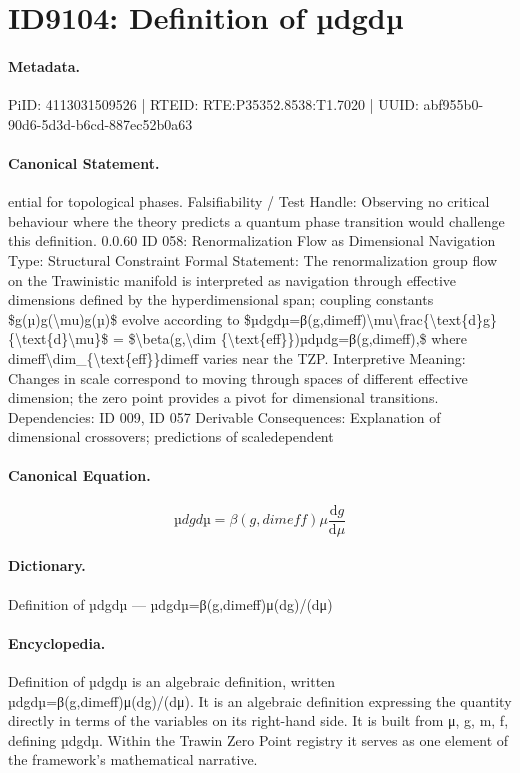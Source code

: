 \section*{ID9104: Definition of µdgdµ}
\paragraph{Metadata.}
PiID: 4113031509526 | RTEID: RTE:P35352.8538:T1.7020 | UUID: abf955b0-90d6-5d3d-b6cd-887ec52b0a63

\paragraph{Canonical Statement.}
ential for topological phases. Falsifiability / Test Handle: Observing no critical behaviour where the theory predicts a quantum phase transition would challenge this definition. 0.0.60 ID 058: Renormalization Flow as Dimensional Navigation Type: Structural Constraint Formal Statement: The renormalization group flow on the Trawinistic manifold is interpreted as navigation through effective dimensions defined by the hyperdimensional span; coupling constants \$g(µ)g(\textbackslash{}mu)g(µ)\$ evolve according to \$µdgdµ=β(g,dimeff)\textbackslash{}mu\textbackslash{}frac\{\textbackslash{}text\{d\}g\}\{\textbackslash{}text\{d\}\textbackslash{}mu\}\$ = \$\textbackslash{}beta(g,\textbackslash{}dim \{\textbackslash{}text\{eff\}\})µdµdg=β(g,dimeff),\$ where dimeff\textbackslash{}dim\_\{\textbackslash{}text\{eff\}\}dimeff varies near the TZP. Interpretive Meaning: Changes in scale correspond to moving through spaces of different effective dimension; the zero point provides a pivot for dimensional transitions. Dependencies: ID 009, ID 057 Derivable Consequences: Explanation of dimensional crossovers; predictions of scaledependent

\paragraph{Canonical Equation.}
\[
µdgdµ=β(g,dimeff)\mu\frac{\text{d}g}{\text{d}\mu}
\]

\paragraph{Dictionary.}
Definition of µdgdµ — µdgdµ=β(g,dimeff)μ(dg)/(dμ)

\paragraph{Encyclopedia.}
Definition of µdgdµ is an algebraic definition, written µdgdµ=β(g,dimeff)μ(dg)/(dμ). It is an algebraic definition expressing the quantity directly in terms of the variables on its right-hand side. It is built from μ, g, m, f, defining µdgdµ. Within the Trawin Zero Point registry it serves as one element of the framework's mathematical narrative.
